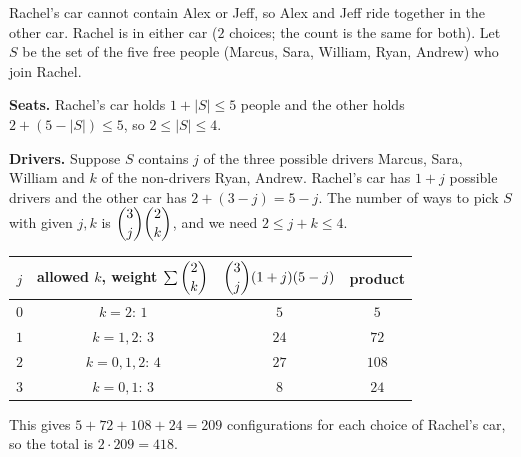 Rachel's car cannot contain Alex or Jeff, so Alex and Jeff ride together in the other car. Rachel is in either car ($2$ choices; the count is the same for both). Let $S$ be the set of the five free people (Marcus, Sara, William, Ryan, Andrew) who join Rachel.

\textbf{Seats.} Rachel's car holds $1+|S|\le5$ people and the other holds $2+(5-|S|)\le5$, so $2\le|S|\le4$.

\textbf{Drivers.} Suppose $S$ contains $j$ of the three possible drivers Marcus, Sara, William and $k$ of the non-drivers Ryan, Andrew. Rachel's car has $1+j$ possible drivers and the other car has $2+(3-j)=5-j$. The number of ways to pick $S$ with given $j,k$ is $\dbinom3j\dbinom2k$, and we need $2\le j+k\le4$.

\begin{center}
\begin{tabular}{c|c|c|c}
$j$ & allowed $k$, weight $\sum\dbinom2k$ & $\dbinom3j(1+j)(5-j)$ & product\\ \hline
$0$ & $k=2$: $1$ & $5$ & $5$\\
$1$ & $k=1,2$: $3$ & $24$ & $72$\\
$2$ & $k=0,1,2$: $4$ & $27$ & $108$\\
$3$ & $k=0,1$: $3$ & $8$ & $24$
\end{tabular}
\end{center}
This gives $5+72+108+24=209$ configurations for each choice of Rachel's car, so the total is $2\cdot209=\boxed{418}$.

